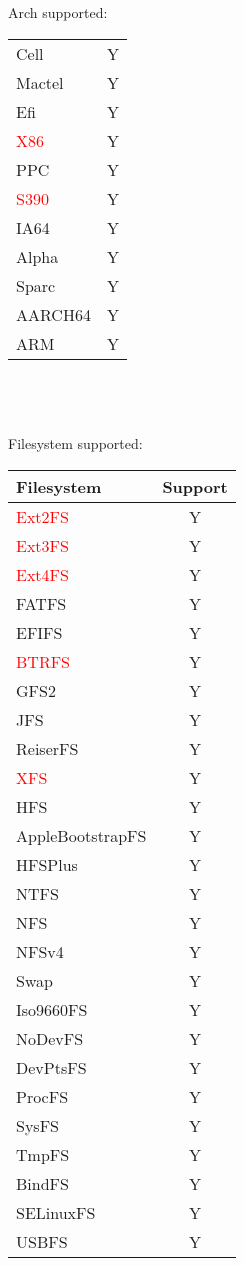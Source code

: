 \documentclass{article}
\begin{document}
Arch supported:\\
\newline
\begin{tabular}{|l|c|}
\hline
    Cell & Y\\
    Mactel & Y\\
    Efi & Y\\
    \textcolor{red}{X86} & Y\\
    PPC & Y\\
    \textcolor{red}{S390} & Y\\
    IA64 & Y\\
    Alpha & Y\\
    Sparc & Y\\
    AARCH64 & Y\\
    ARM & Y\\
\hline
\end{tabular}\\
\\
\\


Filesystem supported:\\
\newline
\begin{tabular}{|l|c|}
\hline
Filesystem & Support \\
\hline
    \textcolor{red}{Ext2FS} & Y\\
    \textcolor{red}{Ext3FS} & Y\\
    \textcolor{red}{Ext4FS}& Y\\
    FATFS & Y\\
    EFIFS & Y\\
    \textcolor{red}{BTRFS} & Y\\
    GFS2 & Y\\
    JFS & Y\\
    ReiserFS & Y\\
    \textcolor{red}{XFS} & Y\\
    HFS & Y\\
    AppleBootstrapFS & Y\\
    HFSPlus & Y\\
    NTFS & Y\\
    NFS & Y\\
    NFSv4 & Y\\
    Swap & Y\\
    Iso9660FS & Y\\
    NoDevFS & Y\\
    DevPtsFS & Y\\
    ProcFS & Y\\
    SysFS & Y\\
    TmpFS & Y\\
    BindFS & Y\\
    SELinuxFS & Y\\
    USBFS & Y\\
\hline
\end{tabular}
\end{document}
